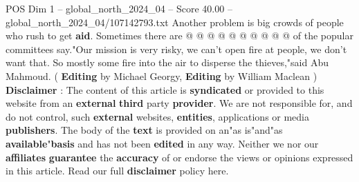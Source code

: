 \begin{textsample}{POS Dim 1 – global\_north\_2024\_04 – Score 40.00 – global\_north\_2024\_04/107142793.txt}
Another problem is big crowds of people who rush to get \textbf{aid}.
Sometimes there are @ @ @ @ @ @ @ @ @ @ of the popular committees say."Our mission is very risky, we can't open fire at people, we don't want that.
So mostly some fire into the air to disperse the thieves,"said Abu Mahmoud. ( \textbf{Editing} by Michael Georgy, \textbf{Editing} by William Maclean ) \textbf{Disclaimer} : The content of this article is \textbf{syndicated} or provided to this website from an \textbf{external} \textbf{third} party \textbf{provider}.
We are not responsible for, and do not control, such \textbf{external} websites, \textbf{entities}, applications or media \textbf{publishers}.
The body of the \textbf{text} is provided on an"as is"and"as \textbf{available}"\textbf{basis} and has not been \textbf{edited} in any way.
Neither we nor our \textbf{affiliates} \textbf{guarantee} the \textbf{accuracy} of or endorse the views or opinions expressed in this article.
Read our full \textbf{disclaimer} policy here.

\end{textsample}

